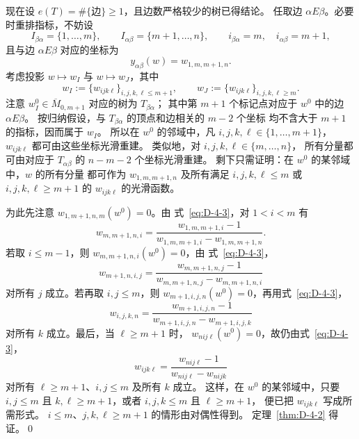现在设 $e(T)=\#\{\text{边}\}\ge1$，且边数严格较少的树已得结论。
任取边 $\alpha E\beta$。必要时重排指标，不妨设
\[
  I_{\beta\alpha}=\{1,\ldots,m\},\qquad
  I_{\alpha\beta}=\{m+1,\ldots,n\},\qquad
  i_{\beta\alpha}=m,\quad i_{\alpha\beta}=m+1,
\]
且与边 $\alpha E\beta$ 对应的坐标为
\[
  y_{\alpha\beta}(w)=w_{1,m,m+1,n}.
\]
考虑投影 $w\mapsto w_I$ 与 $w\mapsto w_J$，其中
\[
  w_I:=\{w_{ijk\ell}\}_{i,j,k,\ell\le m+1},\qquad
  w_J:=\{w_{ijk\ell}\}_{i,j,k,\ell\ge m}.
\]
注意 $w_I^0\in\overline M_{0,m+1}$ 对应的树为 $T_{\beta\alpha}$；
其中第 $m+1$ 个标记点对应于 $w^0$ 中的边 $\alpha E\beta$。
按归纳假设，与 $T_{\beta\alpha}$ 的顶点和边相关的 $m-2$ 个坐标
均不含大于 $m+1$ 的指标，因而属于 $w_I$。
所以在 $w^0$ 的邻域中，凡 $i,j,k,\ell\in\{1,\ldots,m+1\}$，
$w_{ijk\ell}$ 都可由这些坐标光滑重建。
类似地，对 $i,j,k,\ell\in\{m,\ldots,n\}$，
所有分量都可由对应于 $T_{\alpha\beta}$ 的 $n-m-2$ 个坐标光滑重建。
剩下只需证明：在 $w^0$ 的某邻域中，$w$ 的所有分量
都可作为 $w_{1,m,m+1,n}$ 及所有满足
$i,j,k,\ell\le m$ 或 $i,j,k,\ell\ge m+1$ 的
$w_{ijk\ell}$ 的光滑函数。

为此先注意 $w_{1,m+1,n,m}(w^0)=0$。由
式~\eqref{eq:D-4-3}，对 $1<i<m$ 有
\[
  w_{m,m+1,n,i}=
  \frac{w_{1,m,m+1,i}-1}
  {w_{1,m,m+1,i}-w_{1,m,m+1,n}}.
\]
若取 $i\le m-1$，则 $w_{m,m+1,n,i}(w^0)=0$，由
式~\eqref{eq:D-4-3}，
\[
  w_{m+1,n,i,j}=
  \frac{w_{m,m+1,n,j}-1}
  {w_{m,m+1,n,j}-w_{m,m+1,n,i}}
\]
对所有 $j$ 成立。若再取 $i,j\le m$，则
$w_{m+1,i,j,n}(w^0)=0$，再用式~\eqref{eq:D-4-3}，
\[
  w_{i,j,k,n}=
  \frac{w_{m+1,i,j,n}-1}
  {w_{m+1,i,j,n}-w_{m+1,i,j,k}}
\]
对所有 $k$ 成立。最后，当 $\ell\ge m+1$ 时，
$w_{nij\ell}(w^0)=0$，故仍由式~\eqref{eq:D-4-3}，
\[
  w_{ijk\ell}=
  \frac{w_{nij\ell}-1}{w_{nij\ell}-w_{nijk}}
\]
对所有 $\ell\ge m+1$、$i,j\le m$ 及所有 $k$ 成立。
这样，在 $w^0$ 的某邻域中，只要 $i,j\le m$ 且
$k,\ell\ge m+1$，或者 $i,j,k\le m$ 且 $\ell\ge m+1$，
便已把 $w_{ijk\ell}$ 写成所需形式。
$i\le m$、$j,k,\ell\ge m+1$ 的情形由对偶性得到。
定理~\ref{thm:D-4-2} 得证。\qed


